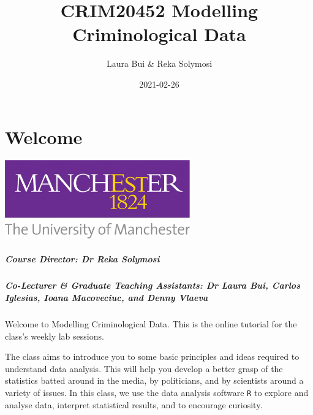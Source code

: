 \documentclass[
]{book}
\title{CRIM20452 Modelling Criminological Data}
\author{Laura Bui \& Reka Solymosi}
\date{2021-02-26}
\begin{document}
\maketitle

{
\setcounter{tocdepth}{1}
\tableofcontents
}
\hypertarget{welcome}{%
\chapter*{Welcome}\label{welcome}}

\includegraphics[width=0.6\textwidth,height=\textheight]{Images/UOM.jpg}

\hypertarget{course-director-dr-reka-solymosi}{%
\paragraph*{Course Director: Dr Reka Solymosi}\label{course-director-dr-reka-solymosi}}

\hypertarget{co-lecturer-graduate-teaching-assistants-dr-laura-bui-carlos-iglesias-ioana-macoveciuc-and-denny-vlaeva}{%
\paragraph*{Co-Lecturer \& Graduate Teaching Assistants: Dr Laura Bui, Carlos Iglesias, Ioana Macoveciuc, and Denny Vlaeva}\label{co-lecturer-graduate-teaching-assistants-dr-laura-bui-carlos-iglesias-ioana-macoveciuc-and-denny-vlaeva}}

Welcome to Modelling Criminological Data. This is the online tutorial for the class's weekly lab sessions.

The class aims to introduce you to some basic principles and ideas required to understand data analysis. This will help you develop a better grasp of the statistics batted around in the media, by politicians, and by scientists around a variety of issues. In this class, we use the data analysis software \texttt{R} to explore and analyse data, interpret statistical results, and to encourage curiosity.
\end{document}
